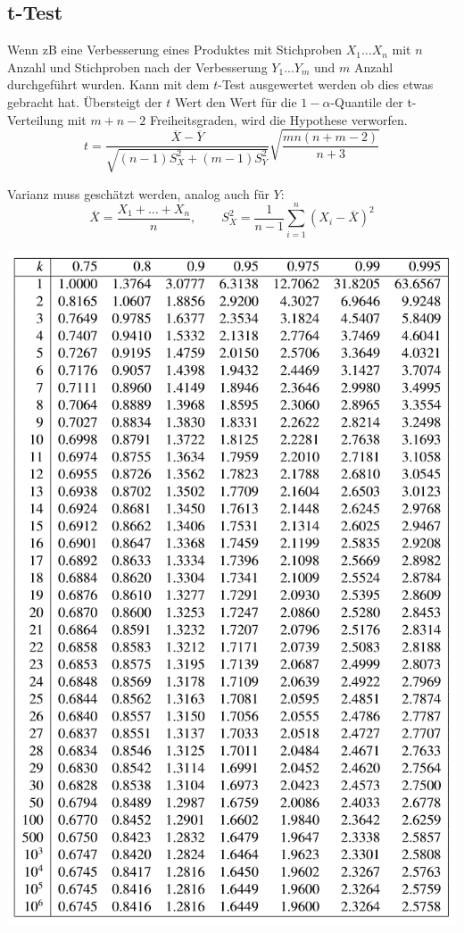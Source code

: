 \subsection{t-Test}
Wenn zB eine Verbesserung eines Produktes mit Stichproben $X_1...X_n$ mit $n$ Anzahl und Stichproben nach der Verbesserung $Y_1...Y_m$ und $m$ Anzahl durchgeführt wurden. Kann mit dem $t$-Test ausgewertet werden ob dies etwas gebracht hat. Übersteigt der $t$ Wert den Wert für die $1-\alpha$-Quantile der t-Verteilung  mit $m+n-2$ Freiheitsgraden, wird die Hypothese verworfen.
\[
t = \frac{\overline{X} - \overline{Y}}{\sqrt{(n -1)S^2_X + (m -1)S^2_Y}}\sqrt{\frac{mn(n+m-2)}{n+3}}
\]

Varianz muss geschätzt werden, analog auch für $Y$:
\[
\overline{X} = \frac{X_1 + \dots + X_n}{n}, \qquad S^2_X = \frac{1}{n-1}\sum_{i=1}^{n}(X_i - \overline{X})^2
\]

\begin{center}
	\includegraphics[width=\columnwidth]{Images/t-tabelle}
\end{center}

